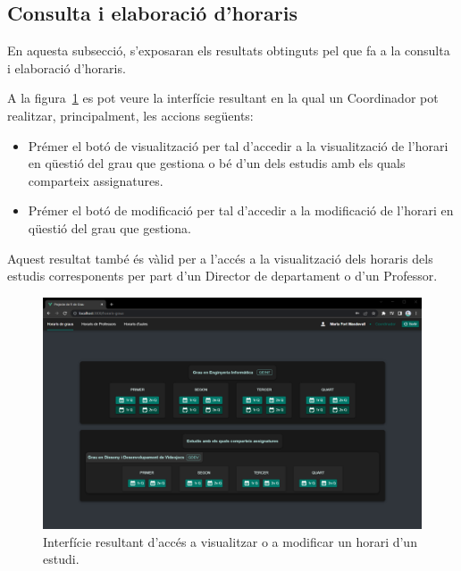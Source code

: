 \documentclass[a4paper,12pt]{ThesisStyle}
\begin{document}
\newpage

\subsection{Consulta i elaboració d'horaris}
\label{subsec:resultats_horaris}

En aquesta subsecció, s'exposaran els resultats obtinguts pel que fa a la consulta i elaboració d'horaris.

A la figura~\ref{img:resultats_horaris_tria} es pot veure la interfície resultant en la qual un Coordinador pot realitzar, principalment, les accions següents:
\begin{itemize}
  \item Prémer el botó de visualització per tal d'accedir a la visualització de l'horari en qüestió del grau que gestiona o bé d'un dels estudis amb els quals comparteix assignatures.
  \item Prémer el botó de modificació per tal d'accedir a la modificació de l'horari en qüestió del grau que gestiona.
\end{itemize}

Aquest resultat també és vàlid per a l'accés a la visualització dels horaris dels estudis corresponents per part d'un Director de departament o d'un Professor.

\begin{figure}[H]
  \centering
  \includegraphics[width=\textwidth]{assets/results/horaris/tria.png}
  \caption{\label{img:resultats_horaris_tria}Interfície resultant d'accés a visualitzar o a modificar un horari d'un estudi.}
\end{figure}

\newpage
\end{document}
